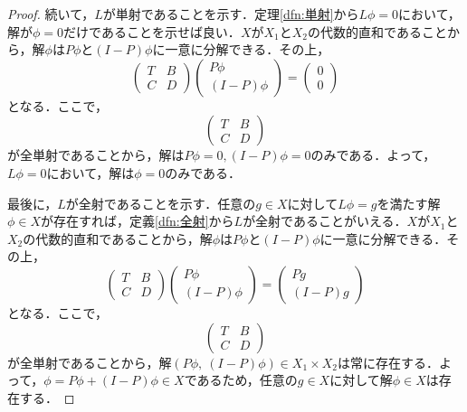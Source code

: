 \begin{proof}
  続いて，$L$が単射であることを示す．定理\ref{dfn:単射}から$L\phi =0$において，解が$\phi=0$だけであることを示せば良い．$X$が$X_1$と$X_2$の代数的直和であることから，解$\phi$は$P\phi$と$(I-P)\phi$に一意に分解できる．その上，
  \begin{equation*}
    \begin{pmatrix}
      T & B \\
      C & D
    \end{pmatrix}
    \begin{pmatrix}
      P\phi\\
      (I-P)\phi
    \end{pmatrix}
    =
    \begin{pmatrix}
      0 \\
      0
    \end{pmatrix}
  \end{equation*}
  となる．ここで，
  \begin{equation*}
    \begin{pmatrix}
      T & B \\
      C & D
    \end{pmatrix}
  \end{equation*}
  が全単射であることから，解は$P\phi = 0, (I-P)\phi=0$のみである．よって，$L \phi = 0$において，解は$\phi=0$のみである．

  最後に，$L$が全射であることを示す．任意の$g \in X$に対して$L \phi = g$を満たす解$\phi \in X$が存在すれば，定義\ref{dfn:全射}から$L$が全射であることがいえる．$X$が$X_1$と$X_2$の代数的直和であることから，解$\phi$は$P\phi$と$(I-P)\phi$に一意に分解できる．その上，
  \begin{equation*}
    \begin{pmatrix}
      T & B \\
      C & D
    \end{pmatrix}
    \begin{pmatrix}
      P\phi \\
      (I-P)\phi
    \end{pmatrix}
    =
    \begin{pmatrix}
      Pg \\
      (I-P)g
    \end{pmatrix}
  \end{equation*}
  となる．ここで，
  \begin{equation*}
    \begin{pmatrix}
      T & B \\
      C & D
    \end{pmatrix}
  \end{equation*}
  が全単射であることから，解$(P\phi,\ (I-P)\phi)\in X_1 \times X_2$は常に存在する．よって，$\phi = P \phi + (I-P)\phi \in X$であるため，任意の$g \in X$に対して解$\phi \in X$は存在する．
\end{proof}

